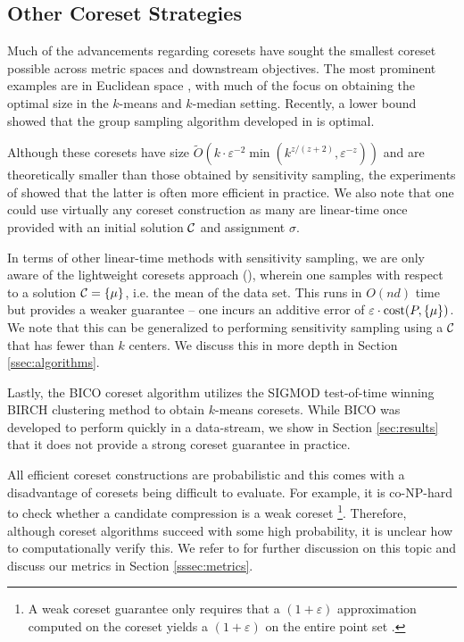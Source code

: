 

\subsection{Other Coreset Strategies}
\label{ssec:clustering_prelim}

Much of the advancements regarding coresets have sought the smallest coreset possible across metric spaces and downstream objectives. The most prominent
examples are in Euclidean space \cite{BadoiuHI02, HaM04, Chen09, HuangV20, stoc22}, with much of the focus on obtaining the optimal size in the $k$-means and
$k$-median setting. Recently, a lower bound \cite{huangLB} showed that the group sampling algorithm developed in \cite{stoc21, stoc22} is optimal.

Although these coresets have size $\tilde{O}(k\cdot \varepsilon^{-2} \min(k^{z/(z+2)},\varepsilon^{-z}))$ \cite{CLSSS22} and are theoretically smaller than
those obtained by sensitivity sampling, the experiments of \cite{chrisESA} showed that the latter is often more efficient in practice. We also note that one
could use virtually any coreset construction as many are linear-time once provided with an initial solution $\mathcal C$ and assignment $\sigma$.

In terms of other linear-time methods with sensitivity sampling, we are only aware of the lightweight coresets approach (\cite{BachemL018}), wherein one
samples with respect to a solution $\mathcal C=\{\mu\}$, i.e. the mean of the data set. This runs in $O(nd)$ time but provides a weaker guarantee -- one incurs an
additive error of $\varepsilon\cdot \operatorname{cost}(P,\{\mu\})$.  We note that this can be generalized to performing sensitivity sampling using a $\mathcal C$ that has fewer
than $k$ centers. We discuss this in more depth in Section \ref{ssec:algorithms}.

Lastly, the BICO coreset algorithm \cite{bico} utilizes the SIGMOD test-of-time winning BIRCH \cite{birch} clustering method to obtain $k$-means coresets. While
BICO was developed to perform quickly in a data-stream, we show in Section \ref{sec:results} that it does not provide a strong coreset guarantee in
practice.

All efficient coreset constructions are probabilistic and this comes with a disadvantage of coresets being difficult to evaluate. For example, it is co-NP-hard
to check whether a candidate compression is a weak coreset \footnote{A weak coreset guarantee only requires that a $(1+\varepsilon)$ approximation computed on
the coreset yields a $(1+\varepsilon)$ on the entire point set \cite{chrisESA}.}. Therefore, although coreset algorithms succeed with some high probability, it
is unclear how to computationally verify this. We refer to \cite{chrisESA} for further discussion on this topic and discuss our metrics in Section
\ref{sssec:metrics}.

